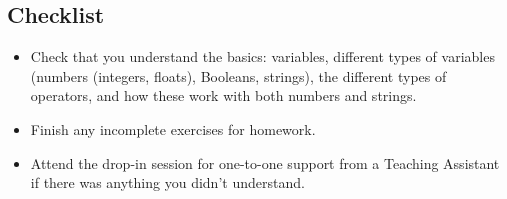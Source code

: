 \documentclass[12pt]{article}
\begin{document}
\subsection*{Checklist}
\begin{itemize}
	\item Check that you understand the basics: variables, different types of variables (numbers (integers, floats), Booleans, strings), the different types of operators, and how these work with both numbers and strings.
	\item Finish any incomplete exercises for homework. 
	\item Attend the drop-in session for one-to-one support from a Teaching Assistant if there was anything you didn't understand.
\end{itemize}
\end{document}
